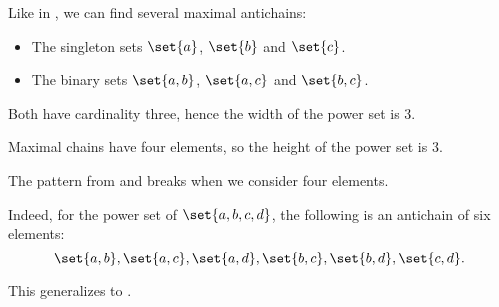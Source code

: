\begin{example}
\begin{thmenum}
    Like in , we can find several maximal antichains:
    \begin{itemize}
      \item The singleton sets \( \set{ a } \), \( \set{ b } \) and \( \set{ c } \).
      \item The binary sets \( \set{ a, b } \), \( \set{ a, c } \) and \( \set{ b, c } \).
    \end{itemize}

    Both have cardinality three, hence the width of the power set is \( 3 \).

    Maximal chains have four elements, so the height of the power set is \( 3 \).

     The pattern from  and  breaks when we consider four elements.

    Indeed, for the power set of \( \set{ a, b, c, d } \), the following is an antichain of six elements:
    \begin{equation}\label{eq:ex:def:partial_order_chain/quad_power_set/antichain}
      \set{ a, b }, \set{ a, c }, \set{ a, d }, \set{ b, c }, \set{ b, d }, \set{ c, d }.
    \end{equation}

    This generalizes to .
  \end{thmenum}
\end{example}

